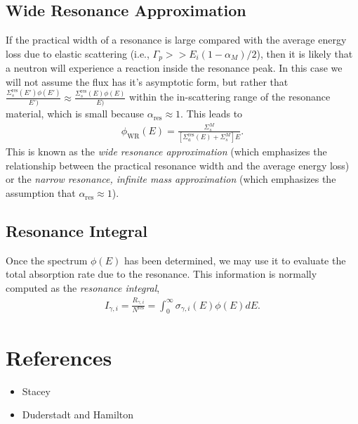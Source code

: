 \documentclass[11pt]{article}
\begin{document}
\subsection{Wide Resonance Approximation}
\label{sec:orgheadline11}
If the practical width of a resonance is large compared with the average energy loss due to elastic scattering (i.e., \(\Gamma_p >> E_i(1-\alpha_M)/2\)), then it is likely that a neutron will experience a reaction inside the resonance peak.  In this case we will not assume the flux has it's asymptotic form, but rather that \(\frac{\Sigma_s^\text{res}(E') \phi(E')}{E')} \approx \frac{\Sigma_s^\text{res}(E) \phi(E)}{E)}\) within the in-scattering range of the resonance material, which is small because \(\alpha_\text{res} \approx 1\).  This leads to
\begin{align}
  \phi_\text{WR}(E)
  = \frac{\Sigma_s^M}{\left[ \Sigma_a^\text{res}(E) + \Sigma_s^M \right] E}.
\end{align}
This is known as the \emph{wide resonance approximation} (which emphasizes the relationship between the practical resonance width and the average energy loss) or the \emph{narrow resonance, infinite mass approximation} (which emphasizes the assumption that \(\alpha_\text{res} \approx 1\)).

\subsection{Resonance Integral}
\label{sec:orgheadline12}
Once the spectrum \(\phi(E)\) has been determined, we may use it to evaluate the total absorption rate due to the resonance.  This information is normally computed as the \emph{resonance integral},
\begin{align}
  I_{\gamma,i} = \frac{R_{\gamma,i}}{N^\text{res}} = \int_0^\infty \sigma_{\gamma,i}(E) \phi(E) dE.
\end{align}
\section{References}
\label{sec:orgheadline14}
\begin{itemize}
\item Stacey
\item Duderstadt and Hamilton
\end{itemize}
\end{document}
